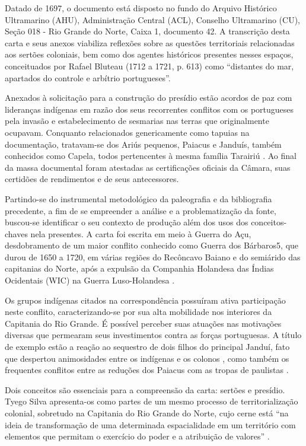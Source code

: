 \begin{refsection}
    Datado de 1697, o documento está disposto no fundo do Arquivo Histórico Ultramarino (AHU), Administração Central (ACL), Conselho Ultramarino (CU), Seção 018 - Rio Grande do Norte, Caixa 1, documento 42. A transcrição desta carta e seus anexos viabiliza reflexões sobre as questões territoriais relacionadas aos sertões coloniais, bem como dos agentes históricos presentes nesses espaços, conceituados por Rafael Bluteau (1712 a 1721, p. 613) como “distantes do mar, apartados do controle e arbítrio portugueses”. 

    Anexados à solicitação para a construção do presídio estão acordos de paz com lideranças indígenas em razão dos seus recorrentes conflitos com os portugueses pela invasão e estabelecimento de sesmarias nas terras que originalmente ocupavam. Conquanto relacionados genericamente como tapuias na documentação, tratavam-se dos Ariús pequenos, Paiacus e Janduís, também conhecidos como Capela, todos pertencentes à mesma família Tarairiú \cite[p.~79]{ARAÚJO2007Muro}. Ao final da massa documental foram atestadas as certificações oficiais da Câmara, suas certidões de rendimentos e de seus antecessores.  

    Partindo-se do instrumental metodológico da paleografia e da bibliografia precedente, a fim de se empreender a análise e a problematização da fonte, buscou-se identificar o seu contexto de produção além dos usos dos conceitos-chaves nela presentes. A carta foi escrita em meio à Guerra do Açu, desdobramento de um maior conflito conhecido como Guerra dos Bárbaros5, que durou de 1650 a 1720, em várias regiões do Recôncavo Baiano e do semiárido das capitanias do Norte, após a expulsão da Companhia Holandesa das Índias Ocidentais (WIC) na Guerra Luso-Holandesa \cite[p.~64]{SILVA2015Ribeira}.

    Os grupos indígenas citados na correspondência possuíram ativa participação neste conflito, caracterizando-se por sua alta mobilidade nos interiores da Capitania do Rio Grande. É possível perceber suas atuações nas motivações diversas que permearam seus investimentos contra as forças portuguesas. A título de exemplo estão a reação ao sequestro de dois filhos do principal Janduí, fato que despertou animosidades entre os indígenas e os colonos \cite[p.~339]{MEDEIROS2008Povos}, como também os frequentes conflitos entre as reduções dos Paiacus com as tropas de paulistas \cite[p.~10]{MAIA2013Aldeias}.

    Dois conceitos são essenciais para a compreensão da carta: sertões e presídio. Tyego Silva apresenta-os como partes de um mesmo processo de territorialização colonial, sobretudo na Capitania do Rio Grande do Norte, cujo cerne está “na ideia de transformação de uma determinada espacialidade em um território com elementos que permitam o exercício do poder e a atribuição de valores” \cite[p.~19]{SILVA2015Ribeira}.


\end{refsection}
